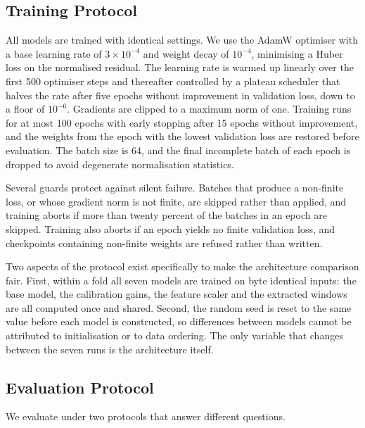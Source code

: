 \subsection{Training Protocol}
\label{sec:training}

All models are trained with identical settings. We use the AdamW optimiser with
a base learning rate of $3 \times 10^{-4}$ and weight decay of $10^{-4}$,
minimising a Huber loss on the normalised residual. The learning rate is warmed
up linearly over the first 500 optimiser steps and thereafter controlled by a
plateau scheduler that halves the rate after five epochs without improvement in
validation loss, down to a floor of $10^{-6}$. Gradients are clipped to a maximum
norm of one. Training runs for at most 100 epochs with early stopping after 15
epochs without improvement, and the weights from the epoch with the lowest
validation loss are restored before evaluation. The batch size is 64, and the
final incomplete batch of each epoch is dropped to avoid degenerate normalisation
statistics.

Several guards protect against silent failure. Batches that produce a non-finite
loss, or whose gradient norm is not finite, are skipped rather than applied, and
training aborts if more than twenty percent of the batches in an epoch are
skipped. Training also aborts if an epoch yields no finite validation loss, and
checkpoints containing non-finite weights are refused rather than written.

Two aspects of the protocol exist specifically to make the architecture
comparison fair. First, within a fold all seven models are trained on byte
identical inputs: the base model, the calibration gains, the feature scaler and
the extracted windows are all computed once and shared. Second, the random seed
is reset to the same value before each model is constructed, so differences
between models cannot be attributed to initialisation or to data ordering. The
only variable that changes between the seven runs is the architecture itself.

\subsection{Evaluation Protocol}
\label{sec:protocol}

We evaluate under two protocols that answer different questions.

